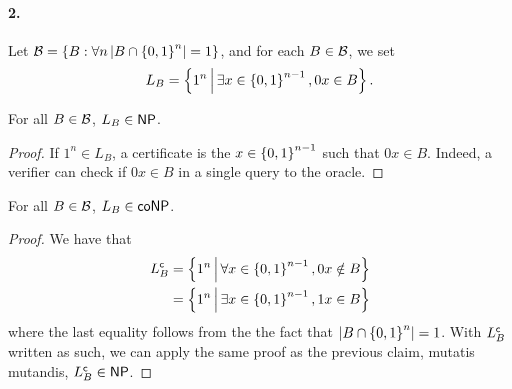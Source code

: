     \paragraph{2.}
    Let $ \mathcal B = \left\{ B : \forall n \left| B \cap \left\{ 0, 1 \right\}^n \right| = 1 \right\} $,
    and for each $B \in \mathcal B$, we set \[
        L_B = \left\{ 1^n \, \middle| \,  \exists x \in \left\{ 0, 1 \right\}^{n-1}, 0x \in B \right\}.
    \]

    \begin{claim}
        For all $B \in \mathcal B$, $L_B \in \mathsf{NP}$.
    \end{claim}
    \begin{proof}
        If $1^n \in L_B$, a certificate is the $x \in \left\{ 0, 1 \right\}^{n-1}$
        such that $0x \in B$. Indeed, a verifier can check if $0x \in B$ in a 
        single query to the oracle.
    \end{proof}


    \begin{claim}
        For all $B \in \mathcal B$, $L_B \in \mathsf{coNP}$.
    \end{claim}
    \begin{proof}
        We have that \begin{align*}
            L_B^\mathsf{c} &=
            \left\{ 1^n \, \middle| \,  
                \forall x \in \left\{ 0, 1 \right\}^{n-1}, 0x \notin B
             \right\}
            \\&=
            \left\{ 1^n \, \middle| \,  
                \exists x \in \left\{ 0, 1 \right\}^{n-1}, 1x \in B
             \right\}
        \end{align*}
        where the last equality follows from the the fact that
        $\left| B \cap \left\{ 0, 1 \right\}^n \right| = 1$.
        With $L_B^\mathsf{c}$ written as such, we can apply the same proof as the previous
        claim, mutatis mutandis, $L_B^\mathsf{c} \in \mathsf{NP}$.
    \end{proof}

